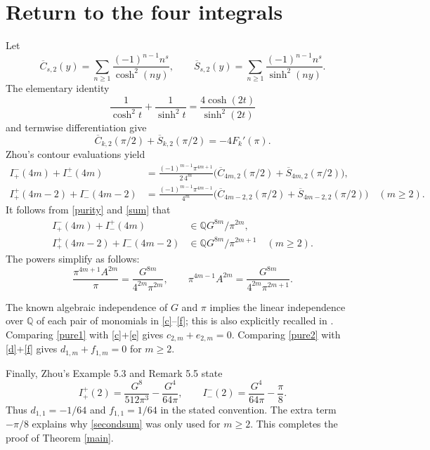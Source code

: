 \documentclass[11pt]{article}
\newcommand{\Q}{\mathbb Q}
\begin{document}
\section*{Return to the four integrals}
Let
\[
 \overline C_{s,2}(y)=\sum_{n\geq1}\frac{(-1)^{n-1}n^s}{\cosh^2(ny)},
 \qquad
 \overline S_{s,2}(y)=\sum_{n\geq1}\frac{(-1)^{n-1}n^s}{\sinh^2(ny)}.
\]
The elementary identity
\[
 \frac1{\cosh^2t}+\frac1{\sinh^2t}
       =\frac{4\cosh(2t)}{\sinh^2(2t)}
\]
and termwise differentiation give
\begin{equation}
 \overline C_{k,2}(\pi/2)+\overline S_{k,2}(\pi/2)
                  =-4F_k'(\pi).                     \label{sum}
\end{equation}
Zhou's contour evaluations
\cite[(5.15), (5.16), (5.33), (5.34)]{Zhou} yield
\begin{align}
 I_+^-(4m)+I_-^+(4m)
   &=\frac{(-1)^{m-1}\pi^{4m+1}}{2\,4^m}
       \bigl(\overline C_{4m,2}(\pi/2)+
                        \overline S_{4m,2}(\pi/2)\bigr),
                                                       \label{firstsum}\\
 I_+^+(4m-2)+I_-^-(4m-2)
   &=\frac{(-1)^{m-1}\pi^{4m-1}}{4^m}
       \bigl(\overline C_{4m-2,2}(\pi/2)+
                        \overline S_{4m-2,2}(\pi/2)\bigr)
                       \quad(m\geq2).                 \label{secondsum}
\end{align}
It follows from \eqref{purity} and \eqref{sum} that
\begin{align}
 I_+^-(4m)+I_-^+(4m)&\in\Q G^{8m}/\pi^{2m},\label{pure1}\\
 I_+^+(4m-2)+I_-^-(4m-2)&\in\Q G^{8m}/\pi^{2m+1}
                                                  \quad(m\geq2).\label{pure2}
\end{align}
The powers simplify as follows:
\[
 \frac{\pi^{4m+1}A^{2m}}{\pi}
       =\frac{G^{8m}}{4^{2m}\pi^{2m}},
 \qquad
 \pi^{4m-1}A^{2m}=\frac{G^{8m}}{4^{2m}\pi^{2m+1}}.
\]

The known algebraic independence of $G$ and $\pi$ implies the
linear independence over $\Q$ of each pair of monomials in
\eqref{c}--\eqref{f}; this is also explicitly recalled in
\cite[Section 3, after equations (101)--(103)]{XuZhao}.
Comparing \eqref{pure1} with \eqref{c}+\eqref{e} gives
$c_{2,m}+e_{2,m}=0$. Comparing \eqref{pure2} with
\eqref{d}+\eqref{f} gives $d_{1,m}+f_{1,m}=0$ for $m\geq2$.

Finally, Zhou's Example 5.3 and Remark 5.5 state
\[
 I_+^+(2)=\frac{G^8}{512\pi^3}-\frac{G^4}{64\pi},
 \qquad
 I_-^-(2)=\frac{G^4}{64\pi}-\frac{\pi}{8}.
\]
Thus $d_{1,1}=-1/64$ and $f_{1,1}=1/64$ in the stated convention.
The extra term $-\pi/8$ explains why \eqref{secondsum} was only
used for $m\geq2$. This completes the proof of Theorem \ref{main}.
\end{document}
